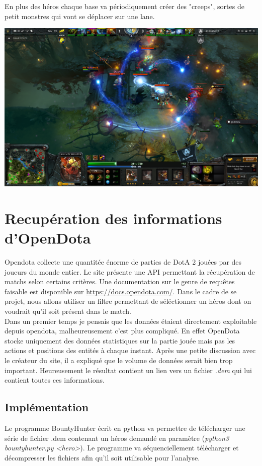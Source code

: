 \documentclass{article}
\begin{document}
En plus des héros chaque base va périodiquement créer des "creeps", sortes de petit monstres qui vont se déplacer sur une lane.

\includegraphics[scale=0.3]{"dota2screen.png"} 

\section{Recupération des informations d'OpenDota}

Opendota collecte une quantitée énorme de parties de DotA 2 jouées par des joueurs du monde entier. Le site présente une API permettant la récupération de matchs selon certains critères. Une documentation sur le genre de requêtes faisable est disponible sur \url{https://docs.opendota.com/}. Dans le cadre de se projet, nous allons utiliser un filtre permettant de séléctionner un héros dont on voudrait qu'il soit présent dans le match.\\
Dans un premier temps je pensais que les données étaient directement exploitable depuis opendota, malheureusement c'est plus compliqué. En effet OpenDota stocke uniquement des données statistiques sur la partie jouée mais pas les actions et positions des entités à chaque instant. Après une petite discussion avec le créateur du site, il a expliqué que le volume de données serait bien trop important. Heureusement le résultat contient un lien vers un fichier \textit{.dem} qui lui contient toutes ces informations.

\subsection{Implémentation}

Le programme BountyHunter écrit en python va permettre de télécharger une série de fichier .dem contenant un héros demandé en paramètre (\textit{python3 bountyhunter.py <hero>}). Le programme va séquenciellement télécharger et décompresser les fichiers afin qu'il soit utilisable pour l'analyse.
\end{document}

